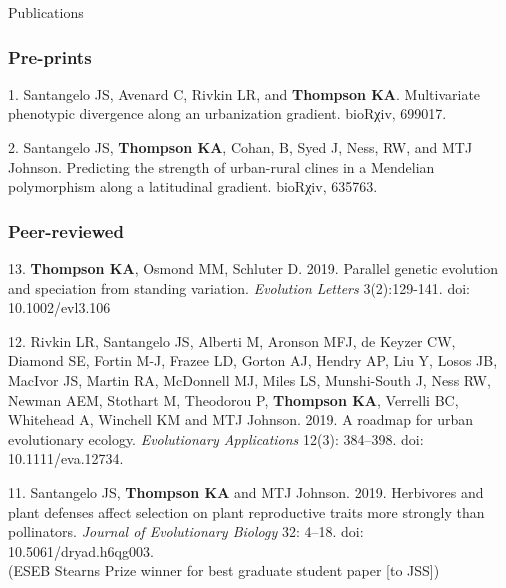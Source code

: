 \documentclass[11pt]{article}
\begin{document}
\noindent\begin{rSection}{Publications}

\subsubsection*{Pre-prints}

\noindent\hspace{.1cm}1. Santangelo JS, Avenard C, Rivkin LR, and \textbf{Thompson KA}. Multivariate phenotypic divergence along an urbanization gradient. bioRχiv, 699017.

\noindent\hspace{.1cm}2. Santangelo JS, \textbf{Thompson KA}, Cohan, B, Syed J, Ness, RW, and MTJ Johnson. Predicting the strength of urban-rural clines in a Mendelian polymorphism along a latitudinal gradient. bioRχiv, 635763.

\subsubsection*{Peer-reviewed}

\noindent\hspace{.1cm}13. \textbf{Thompson KA}, Osmond MM, Schluter D. 2019. Parallel genetic evolution and speciation from standing variation. \textit{Evolution Letters} 3(2):129-141. doi: 10.1002/evl3.106

\noindent\hspace{.1cm}12.  Rivkin LR, Santangelo JS, Alberti M, Aronson MFJ, de Keyzer CW, Diamond SE, Fortin M-J, Frazee LD, Gorton AJ, Hendry AP, Liu Y, Losos JB, MacIvor JS, Martin RA, McDonnell MJ, Miles LS, Munshi-South J, Ness RW, Newman AEM, Stothart M, Theodorou P, \textbf{Thompson KA}, Verrelli BC, Whitehead A, Winchell KM and MTJ Johnson. 2019. A roadmap for urban evolutionary ecology. \textit{Evolutionary Applications} 12(3): 384–398. doi: 10.1111/eva.12734.

\noindent\hspace{.1cm}11. Santangelo JS, \textbf{Thompson KA} and MTJ Johnson. 2019. Herbivores and plant defenses affect selection on plant reproductive traits more strongly than pollinators. \textit{Journal of Evolutionary Biology} 32: 4–18. doi: 10.5061/dryad.h6qg003. \\
(ESEB Stearns Prize winner for best graduate student paper [to JSS])


\end{rSection}
\end{document}
